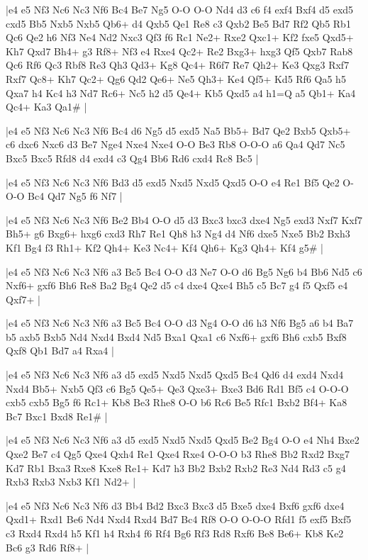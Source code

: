 \whitename{}
\blackname{}
\makegametitle
|e4 e5 Nf3 Nc6 Nc3 Nf6 Bc4 Be7 Ng5 O-O O-O Nd4 d3 c6 f4 exf4 Bxf4 d5 exd5 cxd5 Bb5 Nxb5 Nxb5 Qb6+ d4 Qxb5 Qe1 Re8 c3 Qxb2 Be5 Bd7 Rf2 Qb5 Rb1 Qc6 Qe2 h6 Nf3 Ne4 Nd2 Nxc3 Qf3 f6 Rc1 Ne2+ Rxe2 Qxc1+ Kf2 fxe5 Qxd5+ Kh7 Qxd7 Bh4+ g3 Rf8+ Nf3 e4 Rxe4 Qc2+ Re2 Bxg3+ hxg3 Qf5 Qxb7 Rab8 Qc6 Rf6 Qc3 Rbf8 Re3 Qh3 Qd3+ Kg8 Qc4+ R6f7 Re7 Qh2+ Ke3 Qxg3 Rxf7 Rxf7 Qc8+ Kh7 Qc2+ Qg6 Qd2 Qe6+ Ne5 Qh3+ Ke4 Qf5+ Kd5 Rf6 Qa5 h5 Qxa7 h4 Kc4 h3 Nd7 Rc6+ Nc5 h2 d5 Qe4+ Kb5 Qxd5 a4 h1=Q a5 Qb1+ Ka4 Qc4+ Ka3 Qa1\#  |

\whitename{}
\blackname{}
\makegametitle
|e4 e5 Nf3 Nc6 Nc3 Nf6 Bc4 d6 Ng5 d5 exd5 Na5 Bb5+ Bd7 Qe2 Bxb5 Qxb5+ c6 dxc6 Nxc6 d3 Be7 Nge4 Nxe4 Nxe4 O-O Be3 Rb8 O-O-O a6 Qa4 Qd7 Nc5 Bxc5 Bxc5 Rfd8 d4 exd4 c3 Qg4 Bb6 Rd6 cxd4 Rc8 Bc5  |

\whitename{}
\blackname{}
\makegametitle
|e4 e5 Nf3 Nc6 Nc3 Nf6 Bd3 d5 exd5 Nxd5 Nxd5 Qxd5 O-O e4 Re1 Bf5 Qe2 O-O-O Bc4 Qd7 Ng5 f6 Nf7  |

\whitename{}
\blackname{}
\makegametitle
|e4 e5 Nf3 Nc6 Nc3 Nf6 Be2 Bb4 O-O d5 d3 Bxc3 bxc3 dxe4 Ng5 exd3 Nxf7 Kxf7 Bh5+ g6 Bxg6+ hxg6 cxd3 Rh7 Re1 Qh8 h3 Ng4 d4 Nf6 dxe5 Nxe5 Bb2 Bxh3 Kf1 Bg4 f3 Rh1+ Kf2 Qh4+ Ke3 Nc4+ Kf4 Qh6+ Kg3 Qh4+ Kf4 g5\#  |

\whitename{}
\blackname{}
\makegametitle
|e4 e5 Nf3 Nc6 Nc3 Nf6 a3 Bc5 Bc4 O-O d3 Ne7 O-O d6 Bg5 Ng6 b4 Bb6 Nd5 c6 Nxf6+ gxf6 Bh6 Re8 Ba2 Bg4 Qe2 d5 c4 dxe4 Qxe4 Bh5 c5 Bc7 g4 f5 Qxf5 e4 Qxf7+  |

\whitename{}
\blackname{}
\makegametitle
|e4 e5 Nf3 Nc6 Nc3 Nf6 a3 Bc5 Bc4 O-O d3 Ng4 O-O d6 h3 Nf6 Bg5 a6 b4 Ba7 b5 axb5 Bxb5 Nd4 Nxd4 Bxd4 Nd5 Bxa1 Qxa1 c6 Nxf6+ gxf6 Bh6 cxb5 Bxf8 Qxf8 Qb1 Bd7 a4 Rxa4  |

\whitename{}
\blackname{}
\makegametitle
|e4 e5 Nf3 Nc6 Nc3 Nf6 a3 d5 exd5 Nxd5 Nxd5 Qxd5 Bc4 Qd6 d4 exd4 Nxd4 Nxd4 Bb5+ Nxb5 Qf3 c6 Bg5 Qe5+ Qe3 Qxe3+ Bxe3 Bd6 Rd1 Bf5 c4 O-O-O cxb5 cxb5 Bg5 f6 Rc1+ Kb8 Be3 Rhe8 O-O b6 Rc6 Be5 Rfc1 Bxb2 Bf4+ Ka8 Bc7 Bxc1 Bxd8 Re1\#  |

\whitename{}
\blackname{}
\makegametitle
|e4 e5 Nf3 Nc6 Nc3 Nf6 a3 d5 exd5 Nxd5 Nxd5 Qxd5 Be2 Bg4 O-O e4 Nh4 Bxe2 Qxe2 Be7 c4 Qg5 Qxe4 Qxh4 Re1 Qxe4 Rxe4 O-O-O b3 Rhe8 Bb2 Rxd2 Bxg7 Kd7 Rb1 Bxa3 Rxe8 Kxe8 Re1+ Kd7 h3 Bb2 Bxb2 Rxb2 Re3 Nd4 Rd3 c5 g4 Rxb3 Rxb3 Nxb3 Kf1 Nd2+  |

\whitename{}
\blackname{}
\makegametitle
|e4 e5 Nf3 Nc6 Nc3 Nf6 d3 Bb4 Bd2 Bxc3 Bxc3 d5 Bxe5 dxe4 Bxf6 gxf6 dxe4 Qxd1+ Rxd1 Be6 Nd4 Nxd4 Rxd4 Bd7 Bc4 Rf8 O-O O-O-O Rfd1 f5 exf5 Bxf5 c3 Rxd4 Rxd4 h5 Kf1 h4 Rxh4 f6 Rf4 Bg6 Rf3 Rd8 Rxf6 Be8 Be6+ Kb8 Ke2 Bc6 g3 Rd6 Rf8+  |

